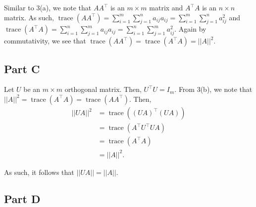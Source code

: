\documentclass[12pt]{article}
\newcommand{\trace}{\operatorname{trace}}
\begin{document}
Similar to 3(a), we note that $AA^\top$ is an $m\times m$ matrix and $A^\top A$ is an $n\times n$ matrix. As such, $\displaystyle\trace(AA^\top) = \sum_{i=1}^m \sum_{j=1}^n a_{ij} a_{ij} = \sum_{i=1}^m \sum_{j=1}^n a_{ij}^2$ and $\displaystyle\trace(A^\top A) = \sum_{i=1}^n \sum_{j=1}^m a_{ij} a_{ij} = \sum_{i=1}^n \sum_{j=1}^m a_{ij}^2$. Again by commutativity, we see that $\trace(AA^\top)=\trace(A^\top A) = ||A||^2$.

\subsection*{Part C}

Let $U$ be an $m\times m$ orthogonal matrix. Then, $U^\top U = I_m$. From 3(b), we note that $||A||^2=\trace(A^\top A)=\trace(A A^\top)$. Then,
\begin{align*}
    ||UA||^2 &= \trace( (UA)^\top (UA) ) \\
    &= \trace(A^\top U^\top U A) \\
    &= \trace(A^\top A) \\
    &= ||A||^2.
\end{align*}

As such, it follows that $||UA||=||A||$.

\subsection*{Part D}
\end{document}
